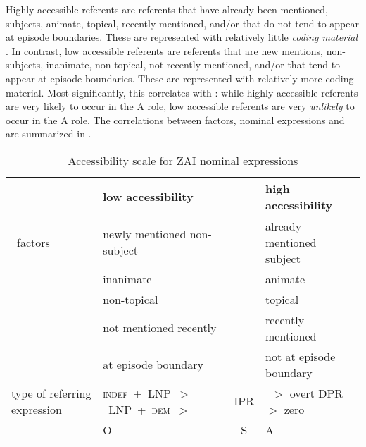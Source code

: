 Highly accessible referents are referents that have already been mentioned, subjects, animate, topical, recently mentioned, and/or that do not tend to appear at episode boundaries. These are represented with relatively little \textit{coding material} \citep{givon1983}. In contrast, low accessible referents are referents that are new mentions, non-subjects, inanimate, non-topical, not recently mentioned, and/or that tend to appear at episode boundaries. These are represented with relatively more coding material. Most significantly, this correlates with : while highly accessible referents are very likely to occur in the A role, low accessible referents are very \textit{unlikely} to occur in the A role. The correlations between  factors, nominal expressions and  are summarized in .


\begin{table}
\small
\begin{tabularx}{\textwidth}{Ql@{}c@{}l}
\lsptoprule
   
&   \textbf{low accessibility}  &  &  \textbf{high accessibility}  \\
  
 
\midrule 

\mbox{ factors} &  newly mentioned non-subject  &   & already mentioned  subject  \\
 
		      &    inanimate  &  & animate  \\
		      &     non-topical  &   & topical  \\
		      &      not mentioned recently  &  & recently mentioned   \\
		      &      at episode boundary  &   & not at episode boundary \\
       
  
\midrule
 
type of referring expression & \mbox{\textsc{indef}  + LNP $>$ LNP + \textsc{dem}  $>$} &    IPR   &~$>$  overt DPR $>$ zero \\
 

 
\midrule 
   & \hfill O \hfill &  S &\hfill A \hfill\\ 
\midrule

\end{tabularx}
\caption{{Accessibility scale for ZAI nominal expressions}}
\label{accessibilityscale}

\end{table}
 
